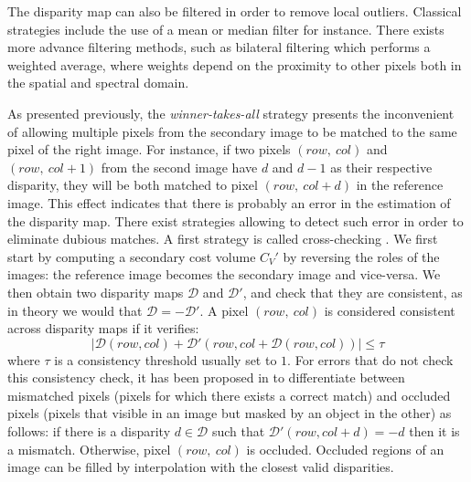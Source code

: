 The disparity map can also be filtered in order to remove local outliers. Classical strategies include the use of a mean or median filter for instance. There exists more advance filtering methods, such as bilateral filtering \cite{tomasi_bilateral_1998} which performs a weighted average, where weights depend on the proximity to other pixels both in the spatial and spectral domain.  

As presented previously, the \textit{winner-takes-all} strategy presents the inconvenient of allowing multiple pixels from the secondary image to be matched to the same pixel of the right image. For instance, if two pixels $(row,~col)$ and $(row,~col+1)$ from the second image have $d$ and $d-1$ as their respective disparity, they will be both matched to pixel $(row, ~col+d)$ in the reference image. This effect indicates that there is probably an error in the estimation of the disparity map. There exist strategies allowing to detect such error in order to eliminate dubious matches. A first strategy is called cross-checking \cite{fua_combining_1991}. We first start by computing a secondary cost volume $C_V'$ by reversing the roles of the images: the reference image becomes the secondary image and vice-versa. We then obtain two disparity maps $\mathcal{D}$ and $\mathcal{D}'$, and check that they are consistent, as in theory we would that $\mathcal{D}=-\mathcal{D}'$. A pixel $(row, ~col)$ is considered consistent across disparity maps if it verifies:
\begin{equation}\label{eq:cross-checking}
    |\mathcal{D}(row, col) + \mathcal{D}'(row, col+\mathcal{D}(row, col))|\leqslant \tau
\end{equation}
where $\tau$ is a consistency threshold usually set to $1$. For errors that do not check this consistency check, it has been proposed in \cite{hirschmuller_stereo_2008} to differentiate between mismatched pixels (pixels for which there exists a correct match) and occluded pixels (pixels that visible in an image but masked by an object in the other) as follows: if there is a disparity $d\in\mathcal{D}$ such that $\mathcal{D}'(row, col+d)=-d$ then it is a mismatch. Otherwise, pixel $(row, ~col)$ is occluded. Occluded regions of an image can be filled by interpolation with the closest valid disparities.  

